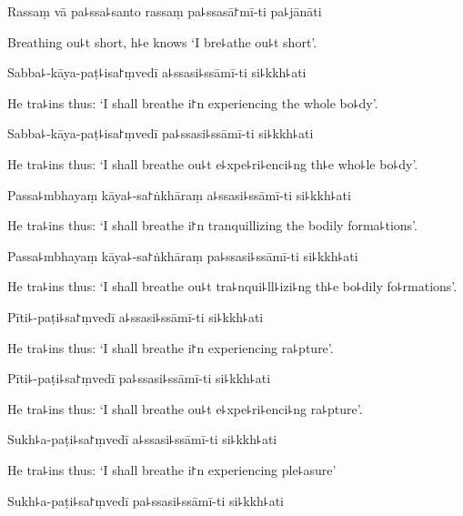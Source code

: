 Rassaṃ vā pa꜕ssa꜕santo rassaṃ pa꜕ssasā꜓mī-ti pa꜕jānāti

\begin{english}
  Breathing ou꜕t short, h꜕e knows `I bre꜕athe ou꜕t short'.
\end{english}

Sabba꜕-kāya-paṭ꜕isa꜓ṃvedī a꜕ssasi꜕ssāmī-ti si꜕kkh꜕ati

\begin{english}
  He tra꜕ins thus: `I shall breathe i꜓n experiencing the whole bo꜕dy'.
\end{english}

Sabba꜕-kāya-paṭ꜕isa꜓ṃvedī pa꜕ssasi꜕ssāmī-ti si꜕kkh꜕ati

\begin{english}
  He tra꜕ins thus: `I shall breathe ou꜕t e꜕xpe꜕ri꜕enci꜕ng th꜕e who꜕le bo꜕dy'.
\end{english}

Passa꜕mbhayaṃ kāya꜕-sa꜓ṅkhāraṃ a꜕ssasi꜕ssāmī-ti si꜕kkh꜕ati

\begin{english}
  He tra꜕ins thus: `I shall breathe i꜓n tranquillizing the bodily forma꜕tions'.
\end{english}

Passa꜕mbhayaṃ kāya꜕-sa꜓ṅkhāraṃ pa꜕ssasi꜕ssāmī-ti si꜕kkh꜕ati

\begin{english}
  He tra꜕ins thus: `I shall breathe ou꜕t tra꜕nqui꜕ll꜕izi꜕ng th꜕e bo꜕dily fo꜕rmations'.
\end{english}

Pīti꜕-paṭi꜕sa꜓ṃvedī a꜕ssasi꜕ssāmī-ti si꜕kkh꜕ati

\begin{english}
  He tra꜕ins thus: `I shall breathe i꜓n experiencing ra꜕pture'.
\end{english}

Pīti꜕-paṭi꜕sa꜓ṃvedī pa꜕ssasi꜕ssāmī-ti si꜕kkh꜕ati

\begin{english}
  He tra꜕ins thus: `I shall breathe ou꜕t e꜕xpe꜕ri꜕enci꜕ng ra꜕pture'.
\end{english}

Sukh꜕a-paṭi꜕sa꜓ṃvedī a꜕ssasi꜕ssāmī-ti si꜕kkh꜕ati

\begin{english}
  He tra꜕ins thus: `I shall breathe i꜓n experiencing ple꜕asure'
\end{english}

Sukh꜕a-paṭi꜕sa꜓ṃvedī pa꜕ssasi꜕ssāmī-ti si꜕kkh꜕ati

